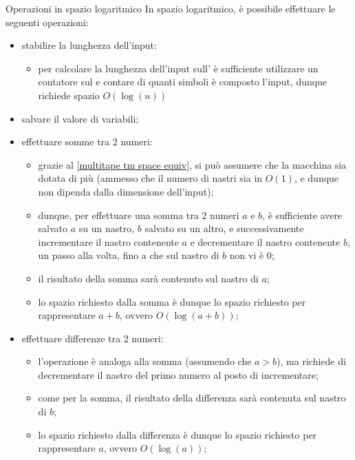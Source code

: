 \documentclass[a4paper, 12pt]{report}
\begin{document}
    \begin{framedprop}[label={log space ops}, breakable]{Operazioni in spazio logaritmico}
        In spazio logaritmico, è possibile effettuare le seguenti operazioni:

        \begin{itemize}
            \item stabilire la lunghezza dell'input:
                \begin{itemize}
                    \item per calcolare la lunghezza dell'input sull' è sufficiente utilizzare un contatore sul  e contare di quanti simboli è composto l'input, dunque richiede spazio $O(\log(n))$
                \end{itemize}
            \item salvare il valore di variabili;
            \item effettuare somme tra 2 numeri:
                \begin{itemize}
                    \item grazie al \cref{multitape tm space equiv}, si può assumere che la macchina sia dotata di più  (ammesso che il numero di nastri sia in $O(1)$, e dunque non dipenda dalla dimensione dell'input);
                    \item dunque, per effettuare una somma tra 2 numeri $a$ e $b$, è sufficiente avere salvato $a$ su un nastro, $b$ salvato su un altro, e successivamente incrementare il nastro contenente $a$ e decrementare il nastro contenente $b$, un passo alla volta, fino a che sul nastro di $b$ non vi è 0;
                    \item il risultato della somma sarà contenuto sul nastro di $a$;
                    \item lo spazio richiesto dalla somma è dunque lo spazio richiesto per rappresentare $a + b$, ovvero $O(\log(a + b))$;
                \end{itemize}
            \item effettuare differenze tra 2 numeri:
                \begin{itemize}
                    \item l'operazione è analoga alla somma (assumendo che $a > b$), ma richiede di decrementare il nastro del primo numero al posto di incrementare;
                    \item come per la somma, il risultato della differenza sarà contenuta sul nastro di $b$;
                    \item lo spazio richiesto dalla differenza è dunque lo spazio richiesto per rappresentare $a$, ovvero $O(\log(a))$;

\end{itemize}
\end{itemize}
\end{framedprop}
\end{document}
